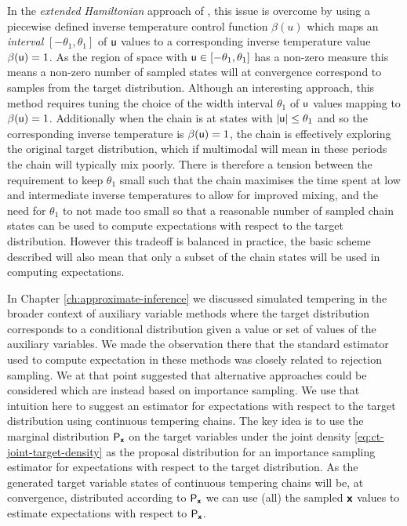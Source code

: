 In the \emph{extended Hamiltonian} approach of \citep{gobbo2015extended}, this issue is overcome by using a piecewise defined inverse temperature control function $\beta(u)$ which maps an \emph{interval} $[-\theta_1,\theta_1]$ of $\mathsf{u}$ values to a corresponding inverse temperature value $\beta(\mathsf{u}) = 1$. As the region of space with $\mathsf{u} \in [-\theta_1,\theta_1]$ has a non-zero measure this means a non-zero number of sampled states will at convergence correspond to samples from the target distribution. Although an interesting approach, this method requires tuning the choice of the width interval $\theta_1$ of $\mathsf{u}$ values mapping to $\beta(\mathsf{u}) = 1$. Additionally when the chain is at states with $|\mathsf{u}| \leq \theta_1$ and so the corresponding inverse temperature is $\beta(\mathsf{u})=1$, the chain is effectively exploring the original target distribution, which if multimodal will mean in these periods the chain will typically mix poorly. There is therefore a tension between the requirement to keep $\theta_1$ small such that the chain maximises the time spent at low and intermediate inverse temperatures to allow for improved mixing, and the need for $\theta_1$ to not made too small so that a reasonable number of sampled chain states can be used to compute expectations with respect to the target distribution. However this tradeoff is balanced in practice, the basic scheme described will also mean that only a subset of the chain states will be used in computing expectations.

In Chapter \ref{ch:approximate-inference} we discussed simulated tempering in the broader context of auxiliary variable methods where the target distribution corresponds to a conditional distribution given a value or set of values of the auxiliary variables. We made the observation there that the standard estimator used to compute expectation in these methods was closely related to rejection sampling. We at that point suggested that alternative approaches could be considered which are instead based on importance sampling. We use that intuition here to suggest an estimator for expectations with respect to the target distribution using continuous tempering chains. The key idea is to use the marginal distribution $\mathsf{P}_{\boldsymbol{\mathsf{x}}}$ on the target variables under the joint density \eqref{eq:ct-joint-target-density} as the proposal distribution for an importance sampling estimator for expectations with respect to the target distribution. As the generated target variable states of continuous tempering chains will be, at convergence, distributed according to $\mathsf{P}_{\boldsymbol{\mathsf{x}}}$ we can use (all) the sampled $\boldsymbol{\mathsf{x}}$ values to estimate expectations with respect to $\mathsf{P}_{\boldsymbol{\mathsf{x}}}$.

